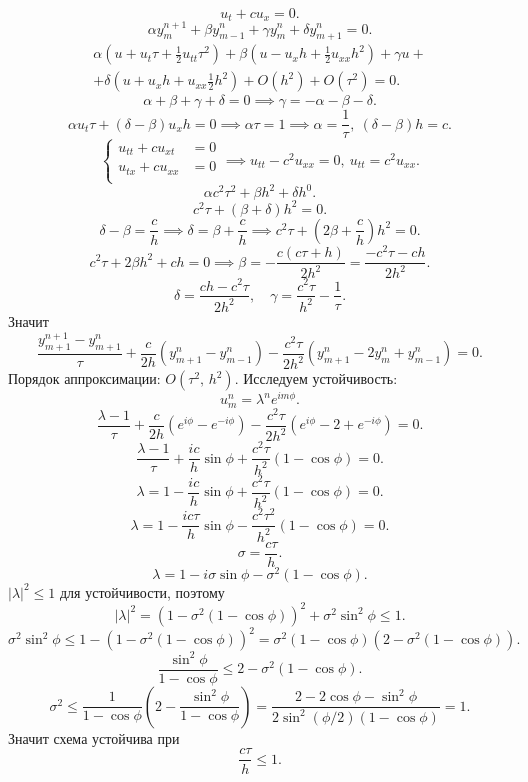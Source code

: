 \documentclass[a4paper]{article}
\begin{document}
\begin{hiProb}[7.2]
\end{hiProb}
\begin{sol}
\[
u_t+  c u_x=0
.\] 
\[
\alpha y_{m}^{n+1}+ \beta y_{m-1}^n+
\gamma y_m^n+\delta y_{m+1}^n=0
.\] 
\begin{multline*}
	\alpha\left(u+u_t \tau + \frac{1}{2} u_{t t}
	\tau^2 \right)+
	\beta\left( 
	u- u_x h + \frac{1}{2} u_{ x x}h^2\right) +
	\gamma u+\\+ \delta \left( u + u_x h+ u_{x x}\frac{1}{2} h^2 \right) + O\left( h^2 \right) +
	O\left( \tau^2 \right)=0
.\end{multline*} 
\[
\alpha+\beta+\gamma+\delta=0 \implies
\gamma=-\alpha -\beta-\delta
.\] 
\[
	\alpha u_t \tau +(\delta-\beta)u_x
	h=0\implies
	\alpha \tau =1\implies \alpha= \frac{1}{\tau},\ (\delta-\beta)h=c
.\] 
\[
\left\{
\begin{aligned}
u_{tt}+ c u_{x t}&= 0 \\
u_{t x}+ c u_{xx}&= 0 \\
\end{aligned}
\right.\implies
u_{t t}- c^2 u_{x x}=0,\ u_{t t}= c^2 u_{x x}
.\] 
\[
\alpha c^2 \tau^2+  \beta h^2+ \delta h^0
.\] 
\[
	c^2\tau+ (\beta+\delta)h^2=0
.\] 
\[
\delta-\beta= \frac{c}{h} \implies
\delta= \beta + \frac{c}{h}\implies
c^2 \tau + \left( 2\beta + \frac{c}{h} \right) h^2=0
.\] 
\[
c^2 \tau+ 2\beta h^2 +ch =0\implies
\beta=  -  \frac{c(c\tau+h)}{2h^2}= \frac{-c^2\tau
-ch }{2h^2}
.\] 
\[
\delta= \frac{c h -c^2  \tau}{2h^2},\quad
\gamma= \frac{c^2 \tau}{h^2}-\frac{1}{\tau}
.\] 
Значит
\[
\frac{y_{m+1}^{n+1}- y_{m+1}^n}{\tau}+
\frac{c}{2h} \left( y_{m+1}^n-y_{m-1}^n \right) -
\frac{c^2 \tau}{2h^2}\left( 
y_{m+1}^n-2 y_m^n+y_{m-1}^n\right) =0
.\] 
Порядок аппроксимации:  $O(\tau^2,\,h^2)$.
Исследуем  устойчивость:
\[
u_{m}^n= \lambda^n  e^{im \phi}
.\] 
\[
\frac{\lambda-1}{\tau}+
\frac{c}{2h} \left( e^{i\phi}-e^{-i\phi} \right) 
- \frac{c^2 \tau}{2h^2}\left( e^{i\phi}-2+
e^{-i\phi}\right) =0
.\] 
\[
\frac{\lambda-1}{\tau}+\frac{i c}{h}\sin \phi
+\frac{c^2 \tau}{h^2} (1-\cos \phi)=0
.\] 
\[
	\lambda=1- \frac{ic}{h}\sin \phi +\frac{c^2 \tau}{h^2}(1-\cos \phi)=0
.\] 
\[
\lambda=1- \frac{ic\tau}{h}  \sin \phi-
\frac{c^2  \tau^2}{h^2}\left( 1- \cos \phi \right) 
=0
.\] 
\[
\sigma= \frac{c  \tau}{h}
.\] 
\[
	\lambda=1-i\sigma \sin \phi-\sigma^2 (1-\cos \phi)
.\] 
$
|\lambda|^2\le 1 
$
для устойчивости, поэтому
\[
	|\lambda|^2= (1- \sigma^2(1-  \cos \phi))^2+
	\sigma^2 \sin ^2 \phi\le 1
.\] 
\[
	\sigma^2 \sin ^2\phi \le 1- \left( 
	1-\sigma^2 \left( 1- \cos \phi \right) \right) ^2= \sigma^2\left( 1-\cos \phi \right) 
	\left( 2- \sigma^2 \left( 1- \cos \phi \right)  \right) 
.\] 
\[
\frac{\sin ^2 \phi}{1- \cos \phi}\le 
2- \sigma^2 (1- \cos \phi)
.\] 
\[
\sigma^2 \le  \frac{1}{1-\cos  \phi}
\left( 2- \frac{\sin ^2 \phi}{1- \cos \phi} \right) 
=\frac{2 -2\cos \phi- \sin ^2 \phi}{2 \sin ^2 \left( \phi /2 \right) \left( 1- \cos  \phi \right) }=1
.\] 
Значит схема устойчива при 
\[
\frac{c\tau}{h}\le 1
.\] 
\end{sol}
\end{document}
